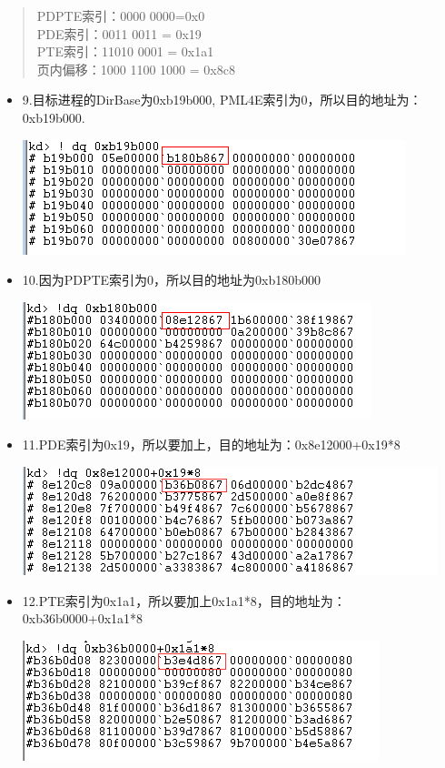 \documentclass[UTF8]{ctexart}
\begin{document}
\begin{itemize}
\begin{verse}
PDPTE索引：0000 0000=0x0\\
PDE索引：0011 0011 = 0x19\\
PTE索引：11010 0001 = 0x1a1\\
页内偏移：1000 1100 1000 = 0x8c8\\
\end{verse}
\begin{itemize}
\item 9.目标进程的DirBase为0xb19b000, PML4E索引为0，所以目的地址为：0xb19b000.
\begin{center}
\includegraphics[width=.9\linewidth]{image/23.png}
\end{center}
\item 10.因为PDPTE索引为0，所以目的地址为0xb180b000
\begin{center}
\includegraphics[width=.9\linewidth]{image/24.png}
\end{center}
\item 11.PDE索引为0x19，所以要加上，目的地址为：0x8e12000+0x19*8
\begin{center}
\includegraphics[width=.9\linewidth]{image/25.png}
\end{center}
\item 12.PTE索引为0x1a1，所以要加上0x1a1*8，目的地址为：0xb36b0000+0x1a1*8
\begin{center}
\includegraphics[width=.9\linewidth]{image/26.png}

\end{center}
\end{itemize}
\end{itemize}
\end{document}
